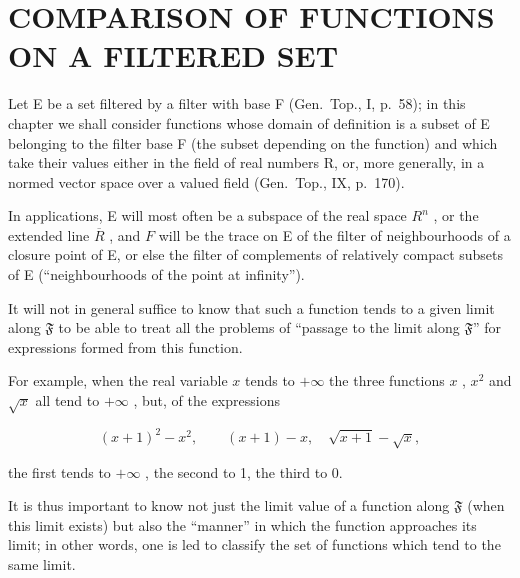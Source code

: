 \section{COMPARISON OF FUNCTIONS ON A FILTERED SET}

Let E be a set filtered by a filter with base F (Gen.~Top., I, p.~58); in this chapter we shall consider functions whose domain of definition is a subset of E belonging to the filter base F (the subset depending on the function) and which take their values either in the field of real numbers R, or, more generally, in a normed vector space over a valued field (Gen.~Top., IX, p.~170).

In applications, E will most often be a subspace of the real space \(R^{n}\) , or the extended line \(\overline{R}\) , and \(F\) will be the trace on E of the filter of neighbourhoods of a closure point of E, or else the filter of complements of relatively compact subsets of E (``neighbourhoods of the point at infinity'').

It will not in general suffice to know that such a function tends to a given limit along \(\mathfrak{F}\) to be able to treat all the problems of ``passage to the limit along \(\mathfrak{F}\)'' for expressions formed from this function.

For example, when the real variable \(x\) tends to \(+\infty\) the three functions \(x\) , \(x^2\) and \(\sqrt{x}\) all tend to \(+\infty\) , but, of the expressions

\[
(x + 1) ^ {2} - x ^ {2}, \qquad (x + 1) - x, \quad \sqrt {x + 1} - \sqrt {x},
\]

the first tends to \(+\infty\) , the second to 1, the third to 0.

It is thus important to know not just the limit value of a function along \(\mathfrak{F}\) (when this limit exists) but also the ``manner'' in which the function approaches its limit; in other words, one is led to classify the set of functions which tend to the same limit.
\relax{}

